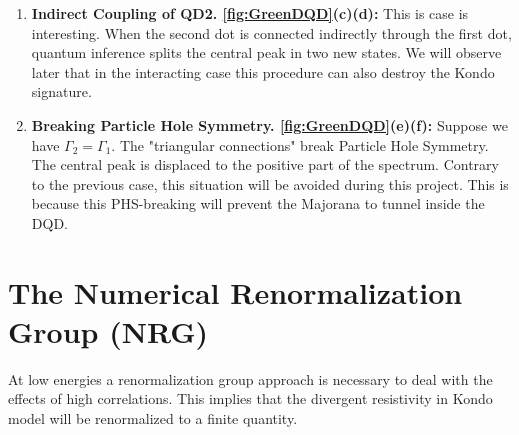 \begin{enumerate}
    \item \textbf{Indirect Coupling of QD2. \ref{fig:GreenDQD}(c)(d):} This is case is interesting. When the second dot is connected indirectly through the first dot, quantum inference splits the central peak in two new states. We will observe later that in the interacting case this procedure can also destroy the Kondo signature. 
    \item \textbf{Breaking Particle Hole Symmetry. \ref{fig:GreenDQD}(e)(f):}
    Suppose we have $\Gamma_2 = \Gamma_1$. The "triangular connections" break Particle Hole Symmetry. The central peak is displaced to the positive part of the spectrum. Contrary to the previous case, this situation will be avoided during this project. This is because this PHS-breaking  will prevent the Majorana to tunnel inside the DQD. 
    
\end{enumerate}



    














\section{The Numerical Renormalization Group\label{sec:The-Numerical-Renormaliztion} (NRG) }


At low energies a renormalization group approach is necessary to deal with the effects of high correlations. This implies that the divergent resistivity in Kondo model will be renormalized to a finite quantity. 
 


